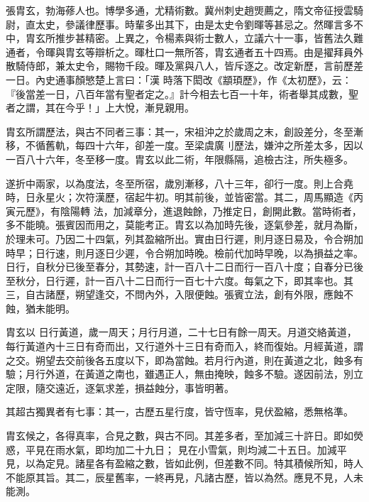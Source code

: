 \begin{pinyinscope}
 張胄玄，勃海蓚人也。博學多通，尤精術數。冀州刺史趙煚薦之，隋文帝征授雲騎尉，直太史，參議律歷事。時輩多出其下，由是太史令劉暉等甚忌之。然暉言多不中，胄玄所推步甚精密。上異之，令楊素與術士數人，立議六十一事，皆舊法久難通者，令暉與胄玄等辯析之。暉杜口一無所答，胄玄通者五十四焉。由是擢拜員外散騎侍郎，兼太史令，賜物千段。暉及黨與八人，皆斥逐之。改定新歷，言前歷差一日。內史通事顏慜楚上言曰：「漢
 時落下閎改《顓頊歷》，作《太初歷》，云：『後當差一日，八百年當有聖者定之。』計今相去七百一十年，術者舉其成數，聖者之謂，其在今乎！」上大悅，漸見親用。



 胄玄所謂歷法，與古不同者三事：其一，宋祖沖之於歲周之末，創設差分，冬至漸移，不循舊軌，每四十六年，卻差一度。至梁虞廣刂歷法，嫌沖之所差太多，因以一百八十六年，冬至移一度。胄玄以此二術，年限縣隔，追檢古注，所失極多。



 遂折中兩家，以為度法，冬至所宿，歲別漸移，八十三年，卻行一度。則上合堯時，日永星火；次符漢歷，宿起牛初。明其前後，並皆密當。其二，周馬顯造《丙寅元歷》，有陰陽轉
 法，加減章分，進退蝕餘，乃推定日，創開此數。當時術者，多不能曉。張賓因而用之，莫能考正。胄玄以為加時先後，逐氣參差，就月為斷，於理未可。乃因二十四氣，列其盈縮所出。實由日行遲，則月逐日易及，令合朔加時早；日行速，則月逐日少遲，令合朔加時晚。檢前代加時早晚，以為損益之率。日行，自秋分已後至春分，其勢速，計一百八十二日而行一百八十度；自春分已後至秋分，日行遲，計一百八十二日而行一百七十六度。每氣之下，即其率也。其三，自古諸歷，朔望逢交，不問內外，入限便蝕。張賓立法，創有外限，應蝕不蝕，猶未能明。



 胄玄以
 日行黃道，歲一周天；月行月道，二十七日有餘一周天。月道交絡黃道，每行黃道內十三日有奇而出，又行道外十三日有奇而入，終而復始。月經黃道，謂之交。朔望去交前後各五度以下，即為當蝕。若月行內道，則在黃道之北，蝕多有驗；月行外道，在黃道之南也，雖遇正人，無由掩映，蝕多不驗。遂因前法，別立定限，隨交遠近，逐氣求差，損益蝕分，事皆明著。



 其超古獨異者有七事：其一，古歷五星行度，皆守恆率，見伏盈縮，悉無格準。



 胄玄候之，各得真率，合見之數，與古不同。其差多者，至加減三十許日。即如熒惑，平見在雨水氣，即均加二十九日；
 見在小雪氣，則均減二十五日。加減平見，以為定見。諸星各有盈縮之數，皆如此例，但差數不同。特其積候所知，時人不能原其旨。其二，辰星舊率，一終再見，凡諸古歷，皆以為然。應見不見，人未能測。




\end{pinyinscope}
